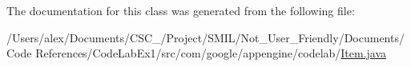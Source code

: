 The documentation for this class was generated from the following file\-:\begin{DoxyCompactItemize}
\item 
/\-Users/alex/\-Documents/\-C\-S\-C\-\_/\-Project/\-S\-M\-I\-L/\-Not\-\_\-\-User\-\_\-\-Friendly/\-Documents/\-Code References/\-Code\-Lab\-Ex1/src/com/google/appengine/codelab/\hyperlink{_item_8java}{Item.\-java}\end{DoxyCompactItemize}
